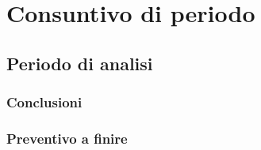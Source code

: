 \section{Consuntivo di periodo}
\subsection{Periodo di analisi}
\subsubsection{Conclusioni}
\subsubsection{Preventivo a finire}
